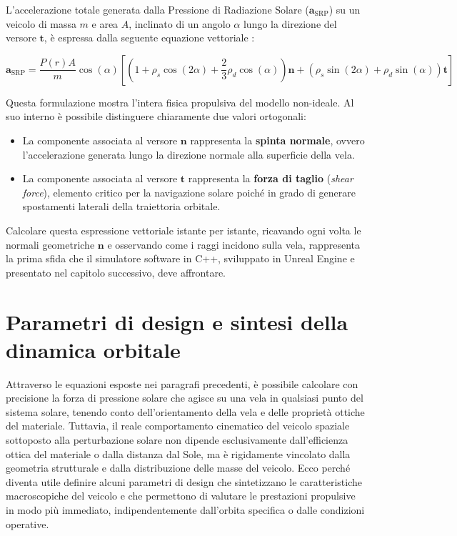 L'accelerazione totale generata dalla Pressione di Radiazione Solare ($\mathbf{a}_{\text{SRP}}$) su un veicolo di massa $m$ e area $A$, inclinato di un angolo $\alpha$ lungo la direzione del versore $\mathbf{t}$, è espressa dalla seguente equazione vettoriale \cite{mcinnes1999solar, simo2016realistic}:

\begin{equation} \label{eq:srp_force_vector}
    \mathbf{a}_{\text{SRP}} = \frac{P(r) A}{m} \cos(\alpha) \left[ \left(1 + \rho_s \cos(2\alpha) + \frac{2}{3}\rho_d \cos(\alpha) \right)\mathbf{n} + \left(\rho_s \sin(2\alpha) + \rho_d \sin(\alpha) \right)\mathbf{t} \right]
\end{equation}

Questa formulazione mostra l'intera fisica propulsiva del modello non-ideale. Al suo interno è possibile distinguere chiaramente due valori ortogonali: 
\begin{itemize}
    \item La componente associata al versore $\mathbf{n}$ rappresenta la \textbf{spinta normale}, ovvero l'accelerazione generata lungo la direzione normale alla superficie della vela.
    \item La componente associata al versore $\mathbf{t}$ rappresenta la \textbf{forza di taglio} (\textit{shear force}), elemento critico per la navigazione solare poiché in grado di generare spostamenti laterali della traiettoria orbitale.
\end{itemize}

Calcolare questa espressione vettoriale istante per istante, ricavando ogni volta le normali geometriche $\mathbf{n}$ e osservando come i raggi incidono sulla vela, rappresenta la prima sfida che il simulatore software in C++, sviluppato in Unreal Engine e presentato nel capitolo successivo, deve affrontare.


\section{Parametri di design e sintesi della dinamica orbitale}
Attraverso le equazioni esposte nei paragrafi precedenti, è possibile calcolare con precisione la forza di pressione solare che agisce su una vela in qualsiasi punto del sistema solare, tenendo conto dell'orientamento della vela e delle proprietà ottiche del materiale.
Tuttavia, il reale comportamento cinematico del veicolo spaziale sottoposto alla perturbazione solare non dipende esclusivamente dall'efficienza ottica del materiale o dalla distanza dal Sole, ma è rigidamente vincolato dalla geometria strutturale e dalla distribuzione delle masse del veicolo. Ecco perché diventa utile definire alcuni parametri di design che sintetizzano le caratteristiche macroscopiche del veicolo e che permettono di valutare le prestazioni propulsive in modo più immediato, indipendentemente dall'orbita specifica o dalle condizioni operative.

